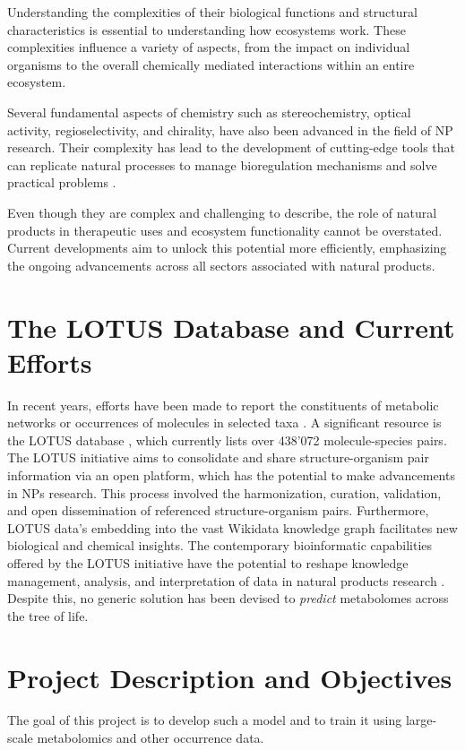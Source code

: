 \documentclass[
11pt, %
oneside, %
english, %
singlespacing, %
headsepline, %
chapterinoneline, %
]{MastersDoctoralThesis} %
\begin{document}
Understanding the complexities of their biological functions and structural characteristics is essential to understanding how ecosystems work. These complexities influence a variety of aspects, from the impact on individual organisms to the overall chemically mediated interactions within an entire ecosystem.

Several fundamental aspects of chemistry such as stereochemistry, optical activity, regioselectivity, and chirality, have also been advanced in the field of NP research. Their complexity has lead to the development of cutting-edge tools that can replicate natural processes to manage bioregulation mechanisms and solve practical problems \cite{drasarGrowingImportanceNatural2019}. 

Even though they are complex and challenging to describe, the role of natural products in therapeutic uses and ecosystem functionality cannot be overstated. Current developments aim to unlock this potential more efficiently, emphasizing the ongoing advancements across all sectors associated with natural products.

\section{The LOTUS Database and Current Efforts}
In recent years, efforts have been made to report the constituents of metabolic networks or occurrences of molecules in selected taxa \cite{rodriguez-lopezPhylogenyAwareChemoinformaticAnalysis2022}. A significant resource is the LOTUS database \cite{rutzLOTUSInitiativeOpen2022}, which currently lists over 438'072 molecule-species pairs. The LOTUS initiative aims to consolidate and share structure-organism pair information via an open platform, which has the potential to make advancements in NPs research. This process involved the harmonization, curation, validation, and open dissemination of referenced structure-organism pairs. Furthermore, LOTUS data's embedding into the vast Wikidata knowledge graph facilitates new biological and chemical insights. The contemporary bioinformatic capabilities offered by the LOTUS initiative have the potential to reshape knowledge management, analysis, and interpretation of data in natural products research \cite{rutzLOTUSInitiativeOpen2022}. Despite this, no generic solution has been devised to \textit{predict} metabolomes across the tree of life.

\section{Project Description and Objectives}
The goal of this project is to develop such a model and to train it using large-scale metabolomics and other occurrence data.
\end{document}

